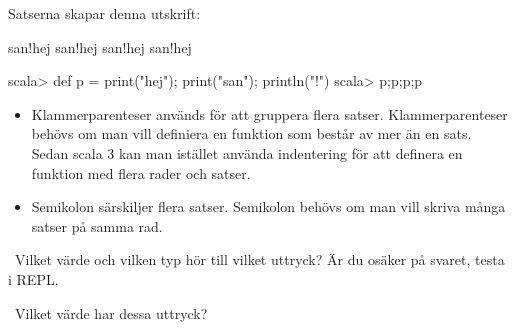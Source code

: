 \SOLUTION

\TaskSolved \what

\SubtaskSolved
Satserna skapar denna utskrift:
\begin{REPLnonum}
san!hej
san!hej
san!hej
san!hej
\end{REPLnonum}

\SubtaskSolved
\begin{REPLnonum}
scala> def p = { print("hej"); print("san"); println("!")}
scala> p;p;p;p
\end{REPLnonum}

\SubtaskSolved
\begin{itemize}
\item Klammerparenteser används för att gruppera flera satser. 
Klammerparenteser behövs om man vill definiera en funktion som består av mer än en sats. 
Sedan scala 3 kan man istället använda indentering för att definera en funktion med flera rader och satser.

\item Semikolon särskiljer flera satser. Semikolon behövs om man vill skriva många satser på samma rad.


\end{itemize}

\QUESTEND





\QUESTBEGIN

\Task \what~Vilket värde och vilken typ hör till vilket uttryck?  Är du osäker på svaret, testa i REPL.

\begin{ConceptConnections}[0.3\textwidth]

\end{ConceptConnections}

\SOLUTION

\TaskSolved \what

\begin{ConceptConnections}[0.3\textwidth]

\end{ConceptConnections}

\QUESTEND






\QUESTBEGIN

\Task \what~Vilket värde har dessa uttryck?  %

\Subtask {}


